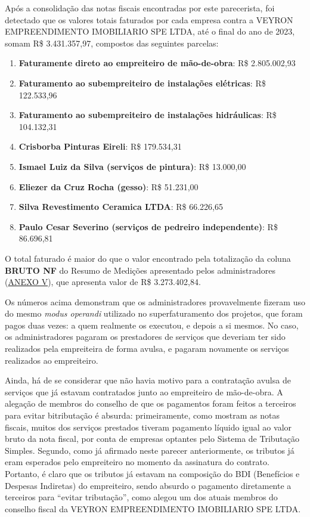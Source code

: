 \documentclass[
  letterpaper,
  DIV=11,
  numbers=noendperiod]{scrreprt}
\providecommand{\tightlist}{%
  \setlength{\itemsep}{0pt}\setlength{\parskip}{0pt}}
\begin{document}
Após a consolidação das notas fiscais encontradas por este parecerista,
foi detectado que os valores totais faturados por cada empresa contra a
VEYRON EMPREENDIMENTO IMOBILIARIO SPE LTDA, até o final do ano de 2023,
somam R\$ 3.431.357,97, compostos das seguintes parcelas:

\begin{enumerate}
\def\labelenumi{\arabic{enumi}.}
\tightlist
\item
  \textbf{Faturamente direto ao empreiteiro de mão-de-obra}: R\$
  2.805.002,93
\item
  \textbf{Faturamento ao subempreiteiro de instalações elétricas}: R\$
  122.533,96
\item
  \textbf{Faturamento ao subempreiteiro de instalações hidráulicas}: R\$
  104.132,31
\item
  \textbf{Crisborba Pinturas Eireli}: R\$ 179.534,31
\item
  \textbf{Ismael Luiz da Silva (serviços de pintura)}: R\$ 13.000,00
\item
  \textbf{Eliezer da Cruz Rocha (gesso)}: R\$ 51.231,00
\item
  \textbf{Silva Revestimento Ceramica LTDA}: R\$ 66.226,65
\item
  \textbf{Paulo Cesar Severino (serviços de pedreiro independente)}: R\$
  86.696,81
\end{enumerate}

O total faturado é maior do que o valor encontrado pela totalização da
coluna \textbf{BRUTO NF} do Resumo de Medições apresentado pelos
administradores (\hyperref[anexo-v]{ANEXO V}), que apresenta valor de
R\$ 3.273.402,84.

Os números acima demonstram que os administradores provavelmente fizeram
uso do mesmo \emph{modus operandi} utilizado no superfaturamento dos
projetos, que foram pagos duas vezes: a quem realmente os executou, e
depois a si mesmos. No caso, os administradores pagaram os prestadores
de serviços que deveriam ter sido realizados pela empreiteira de forma
avulsa, e pagaram novamente os serviços realizados ao empreiteiro.

Ainda, há de se considerar que não havia motivo para a contratação
avulsa de serviços que já estavam contratados junto ao empreiteiro de
mão-de-obra. A alegação de membros do conselho de que os pagamentos
foram feitos a terceiros para evitar bitributação é absurda:
primeiramente, como mostram as notas fiscais, muitos dos serviços
prestados tiveram pagamento líquido igual ao valor bruto da nota fiscal,
por conta de empresas optantes pelo Sistema de Tributação Simples.
Segundo, como já afirmado neste parecer anteriormente, os tributos já
eram esperados pelo empreiteiro no momento da assinatura do contrato.
Portanto, é claro que os tributos já estavam na composição do BDI
(Benefícios e Despesas Indiretas) do empreiteiro, sendo absurdo o
pagamento diretamente a terceiros para ``evitar tributação'', como
alegou um dos atuais membros do conselho fiscal da VEYRON EMPREENDIMENTO
IMOBILIARIO SPE LTDA.
\end{document}
